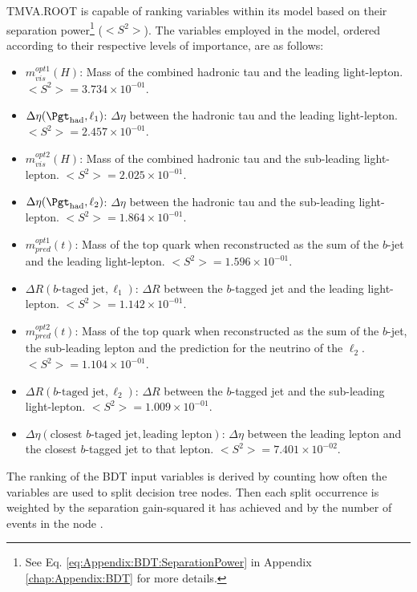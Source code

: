TMVA.ROOT is capable of ranking variables within its model based on their separation 
power\footnote{See Eq. \ref{eq:Appendix:BDT:SeparationPower} in Appendix \ref{chap:Appendix:BDT} for more details.}
 ($<S^{2}>$). 
The variables employed in the model, ordered according to their respective levels of importance, are as follows:
\begin{itemize}
   	\item $m^{opt1}_{vis}(H)$: Mass of the combined hadronic tau and the 
		leading light-lepton. %
		 $<S^{2}> = 3.734 \times 10^{-01}$.
   	\item $\Delta \eta(\tauhad, \ell_{1})$: $\Delta \eta$ between the 
		hadronic tau and the leading light-lepton. %
		 $<S^{2}> = 2.457 \times 10^{-01}$.
    	\item $m^{opt2}_{vis}(H)$: Mass of the combined hadronic tau and 
		the sub-leading light-lepton. %
		 $<S^{2}> = 2.025 \times 10^{-01}$.
   	\item $\Delta \eta(\tauhad, \ell_{2})$: $\Delta \eta$ between the 
		hadronic tau and the sub-leading light-lepton. %
		 $<S^{2}> = 1.864 \times 10^{-01}$.
    	\item $m^{opt1}_{pred}(t)$: Mass of the top quark when reconstructed 
		as the sum of the $b$-jet and the leading light-lepton.  %
		 $<S^{2}> = 1.596 \times 10^{-01}$.
    	\item $\Delta R(b\text{-taged jet}, \ell_{1})$: $\Delta R$ between the 
		$b$-tagged jet and the leading light-lepton. %
		 $<S^{2}> = 1.142 \times 10^{-01}$.
    	\item $m^{opt2}_{pred}(t)$: Mass of the top quark when reconstructed 
		as the sum of the $b$-jet, the sub-leading lepton and the prediction for the neutrino
		of the $\ell_{2}$. %
		 $<S^{2}> = 1.104 \times 10^{-01}$.
	\item $\Delta R(b\text{-taged jet}, \ell_{2})$: $\Delta R$ between the 
		$b$-tagged jet and the sub-leading light-lepton.%
		 $<S^{2}> = 1.009 \times 10^{-01}$.
    	\item $\Delta \eta(\text{closest }b\text{-taged jet}, \text{leading lepton})$: 
		$\Delta \eta$ between the leading lepton and the closest $b$-tagged 
		jet to that lepton.%
		 $<S^{2}> = 7.401 \times 10^{-02}$.
\end{itemize}
The ranking of the BDT input variables is derived by counting how often the variables are used to 
split decision tree nodes. Then each split occurrence is weighted by the separation gain-squared 
it has achieved and by the number of events in the node \cite{Breiman1984ClassificationAR}.

